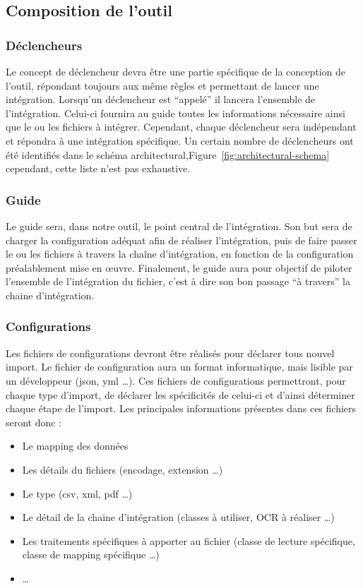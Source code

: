 \subsection{Composition de l'outil}

\subsubsection{Déclencheurs}

Le concept de déclencheur devra être une partie spécifique de la conception de l'outil, répondant toujours aux même règles et permettant de lancer une intégration. Lorsqu'un déclencheur est ``appelé'' il lancera l'ensemble de l'intégration. Celui-ci fournira au guide toutes les informations nécessaire ainsi que le ou les fichiers à intégrer. Cependant, chaque déclencheur sera indépendant et répondra à une intégration spécifique. Un certain nombre de déclencheurs ont été identifiés dans le schéma architectural,Figure~\ref{fig:architectural-schema} cependant, cette liste n'est pas exhaustive.

\subsubsection{Guide}

Le guide sera, dans notre outil, le point central de l'intégration. Son but sera de charger la configuration adéquat afin de réaliser l'intégration, puis de faire passer le ou les fichiers à travers la chaîne d'intégration, en fonction de la configuration préalablement mise en œuvre. Finalement, le guide aura pour objectif de piloter l'ensemble de l'intégration du fichier, c'est à dire son bon passage ``à travers'' la chaine d'intégration.


\subsubsection{Configurations}

Les fichiers de configurations devront être réalisés pour déclarer tous nouvel import. Le fichier de configuration aura un format informatique, mais lisible par un développeur (json, yml \dots). Ces fichiers de configurations permettront, pour chaque type d'import, de déclarer les spécificités de celui-ci et d'ainsi déterminer chaque étape de l'import. Les principales informations présentes dans ces fichiers seront donc :

\begin{itemize}
    \item Le mapping des données
    \item Les détails du fichiers (encodage, extension \dots)
    \item Le type (csv, xml, pdf \dots)
    \item Le détail de la chaine d'intégration (classes à utiliser, OCR à réaliser \dots)
    \item Les traitements spécifiques à apporter au fichier (classe de lecture spécifique, classe de mapping spécifique \dots)
    \item \dots
\end{itemize}

